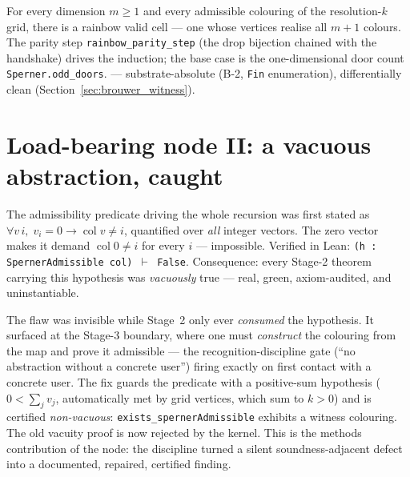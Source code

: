\begin{theorem}
\label{thm:brouwer_sperner}
\leanok
{}
For every dimension $m \ge 1$ and every admissible colouring of the resolution-$k$
grid, there is a rainbow valid cell --- one whose vertices realise all $m{+}1$
colours.  The parity step \texttt{rainbow\_parity\_step} (the drop bijection chained
with the handshake) drives the induction; the base case is the one-dimensional door
count \texttt{Sperner.odd\_doors}.
 --- substrate-absolute (B-2,
\texttt{Fin} enumeration), differentially clean (Section~\ref{sec:brouwer_witness}).
\end{theorem}

\section{Load-bearing node II: a vacuous abstraction, caught}
\label{sec:brouwer_finding}

\begin{finding}
\label{find:brouwer_s1}
\leanok
The admissibility predicate driving the whole recursion was first stated as
$\forall v\,i,\; v_i = 0 \to \operatorname{col} v \ne i$, quantified over \emph{all}
integer vectors.  The zero vector makes it demand $\operatorname{col} 0 \ne i$ for
every $i$ --- impossible.  Verified in Lean: \texttt{(h : SpernerAdmissible col)
$\vdash$ False}.  Consequence: every Stage-2 theorem carrying this hypothesis was
\emph{vacuously} true --- real, green, axiom-audited, and uninstantiable.
\end{finding}

The flaw was invisible while Stage~2 only ever \emph{consumed} the hypothesis.  It
surfaced at the Stage-3 boundary, where one must \emph{construct} the colouring from
the map and prove it admissible --- the recognition-discipline gate (``no abstraction
without a concrete user'') firing exactly on first contact with a concrete user.
The fix guards the predicate with a positive-sum hypothesis
($0 < \sum_j v_j$, automatically met by grid vertices, which sum to $k>0$) and is
certified \emph{non-vacuous}: \texttt{exists\_spernerAdmissible} exhibits a witness
colouring.  The old vacuity proof is now rejected by the kernel.  This is the methods
contribution of the node: the discipline turned a silent soundness-adjacent defect
into a documented, repaired, certified finding.

